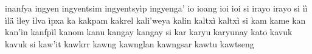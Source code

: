 \documentclass[a4paper]{article}
\begin{document}
inanfya\hspace{2mm}
ingyen\hspace{2mm}
ingyentsim\hspace{2mm}
ingyentsyìp\hspace{2mm}
ingyenga'\hspace{2mm}
io\hspace{2mm}
ioang\hspace{2mm}
ioi\hspace{2mm}
ioi si\hspace{2mm}
irayo\hspace{2mm}
irayo si\hspace{2mm}
ìì\hspace{2mm}
ìlä\hspace{2mm}
ìley\hspace{2mm}
ìlva\hspace{2mm}
ìpxa\hspace{2mm}
ka\hspace{2mm}
kakpam\hspace{2mm}
kakrel\hspace{2mm}
kali'weya\hspace{2mm}
kalin\hspace{2mm}
kaltxì\hspace{2mm}
kaltxì si\hspace{2mm}
kam\hspace{2mm}
kame\hspace{2mm}
kan\hspace{2mm}
kan'ìn\hspace{2mm}
kanfpìl\hspace{2mm}
kanom\hspace{2mm}
kanu\hspace{2mm}
kangay\hspace{2mm}
kangay si\hspace{2mm}
kar\hspace{2mm}
karyu\hspace{2mm}
karyunay\hspace{2mm}
kato\hspace{2mm}
kavuk\hspace{2mm}
kavuk si\hspace{2mm}
kaw'it\hspace{2mm}
kawkrr\hspace{2mm}
kawng\hspace{2mm}
kawnglan\hspace{2mm}
kawngsar\hspace{2mm}
kawtu\hspace{2mm}
kawtseng\hspace{2mm}
\end{document}
